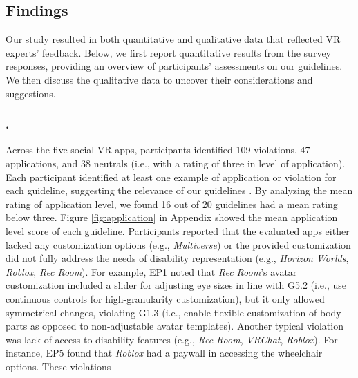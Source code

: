 
\subsection{Findings}
Our study resulted in both quantitative and qualitative data that reflected VR experts' feedback. Below, we first report quantitative results from the survey responses, providing an overview of participants' assessments on our guidelines. We then discuss the qualitative data to uncover their considerations and suggestions. 

\subsubsection{.}
Across the five social VR apps, participants identified 109 violations, 47 applications, and 38 neutrals (i.e., with a rating of three in level of application). %
Each participant identified at least one example of application or violation for each guideline, suggesting the relevance of our guidelines \cite{human_ai_guidelines}. By analyzing the mean rating of application level, we found 16 out of 20 guidelines had a mean rating below three. Figure \ref{fig:application} in Appendix showed the mean application level score of each guideline. Participants reported that the evaluated apps either lacked any customization options (e.g., \textit{Multiverse}) or the provided customization did not fully address the needs of disability representation (e.g., \textit{Horizon Worlds}, \textit{Roblox}, \textit{Rec Room}). For example, EP1 noted that \textit{Rec Room}'s avatar customization included a slider for adjusting eye sizes in line with G5.2 (i.e., use continuous controls for high-granularity customization), but it only allowed symmetrical changes, violating G1.3 (i.e., enable flexible customization of body parts as opposed to non-adjustable avatar templates). Another typical violation was lack of access to disability features (e.g., \textit{Rec Room}, \textit{VRChat}, \textit{Roblox}). For instance, EP5 found that \textit{Roblox} had a paywall in accessing the wheelchair options. These violations 

